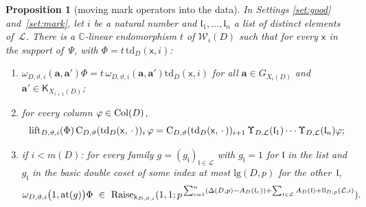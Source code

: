 \documentclass[11pt,a4paper]{article}
\theoremstyle{plainx}
\newtheorem{proposition}[theorem]{Proposition}
\theoremstyle{uprightx}
\newcommand{\CC}{\mathbb{C}}
\newcommand{\mD}[1]{m(#1)}
\newcommand{\XD}[2]{X_{#2}(#1)}
\newcommand{\rr}[2]{\mathrm{lg}(#1,#2)}
\newcommand{\DeltaP}[2]{\Delta(#1,#2)}
\newcommand{\raises}[4]{\mathrm{Raise}_{#1}(#2,#3;#4)}
\newcommand{\td}[3]{\mathrm{td}_{#1}(#2,#3)}
\newcommand{\lk}[3]{\mathrm{k}_{#1,#2,#3}}
\newcommand{\lkom}[3]{\omega_{#1,#2,#3}}
\newcommand{\lklift}[3]{\operatorname{lift}_{#1,#2,#3}}
\newcommand{\chn}[4]{\mathrm{C}_{#1,#2}(#3)_{#4}}
\newcommand{\mexp}[2]{A_{#1}(#2)}
\newcommand{\Wfin}[2]{\mathcal{W}_{#2}(#1)}
\newcommand{\Gf}[1]{G_{#1}}
\newcommand{\Kf}[1]{\mathsf{K}_{#1}}
\begin{document}
\begin{proposition}[moving mark operators into the data]\label{p:move}
In Settings \ref{set:good} and~\ref{set:mark}, let $i$ be a natural number and
$\mathfrak{l}_1,\dots,\mathfrak{l}_n$ a list of distinct elements of~$\mathcal{L}$. There is a $\CC$-linear
endomorphism $t$ of\/ $\Wfin{D}{i}$ such that for every $\mathsf{x}$ in the support of~$\Psi$, with
$\Phi=t\,\td{D}{\mathsf{x}}{i}$:
\begin{enumerate}[label=(\alph*)]
\item $\lkom{D}{\vartheta}{i}(\mathbf{a},\mathbf{a}')\Phi=t\,\lkom{D}{\vartheta}{i}(\mathbf{a},\mathbf{a}')\td{D}{\mathsf{x}}{i}$ for all
$\mathbf{a}\in\Gf{\XD{D}{i}}$ and $\mathbf{a}'\in\Kf{\XD{D}{i+1}}$;
\item for every column $\varphi\in\mathrm{Col}(D)$,
\[\lklift{D}{\vartheta}{i}(\Phi)\,\chn{D}{\vartheta}{\td{D}{\mathsf{x}}{\,\cdot\,}}{i}\,\varphi=\chn{D}{\vartheta}{\td{D}{\mathsf{x}}{\,\cdot\,}}{i+1}\,\markop{\mathcal{L}}{\mathfrak{l}_1}\cdots\markop{\mathcal{L}}{\mathfrak{l}_n}\varphi ;\]
\item if $i<\mD{D}$: for every family $g=(g_{\mathfrak{l}})_{\mathfrak{l}\in\mathcal{L}}$ with $g_{\mathfrak{l}}=1$
for $\mathfrak{l}$ in the list and $g_{\mathfrak{l}}$ in the basic double coset of some index at most
$\rr{D}{p}$ for the other~$\mathfrak{l}$,
\[\lkom{D}{\vartheta}{i}\bigl(1,\mathrm{at}(g)\bigr)\Phi\ \in\ \raises{\lk{D}{\vartheta}{i}}{1}{1}{p^{\,\sum_{c=1}^{n}(\DeltaP{D}{p}-\mexp{D}{\mathfrak{l}_c})+\sum_{\mathfrak{l}\in\mathcal{L}}\mexp{D}{\mathfrak{l}}+\liftloss{\mathcal{L}}{i}}}.\]
\end{enumerate}
\end{proposition}
\end{document}
